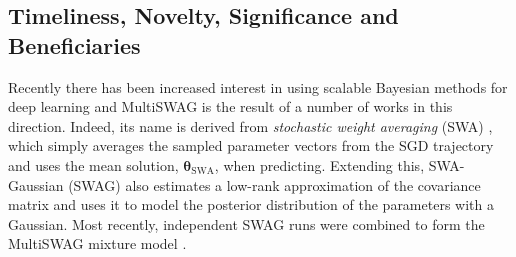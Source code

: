 \documentclass[a4paper,11pt]{article}
\newcommand{\bgreek}[1]{\boldsymbol{#1}}
\begin{document}


%

\subsection{Timeliness, Novelty, Significance and Beneficiaries}

Recently there has been increased interest in using scalable Bayesian methods for deep learning and MultiSWAG is the result of a number of works in this direction. Indeed, its name is derived from \emph{stochastic weight averaging} (SWA) \cite{izmailov2018}, which simply averages the sampled parameter vectors from the SGD trajectory and uses the mean solution, $\bgreek{\theta}_{\text{SWA}}$, when predicting. Extending this, SWA-Gaussian (SWAG) \cite{maddox2019} also estimates a low-rank approximation of the covariance matrix and uses it to model the posterior distribution of the parameters with a Gaussian. Most recently, independent SWAG runs were combined to form the MultiSWAG mixture model \cite{izmailov2020}. 
\end{document}
